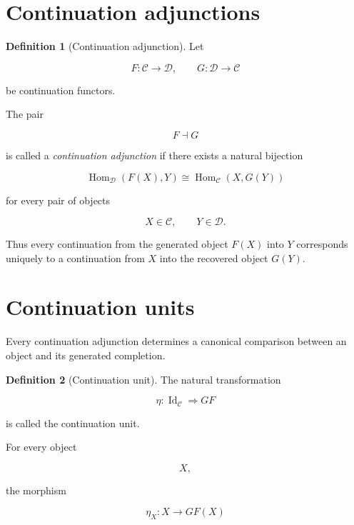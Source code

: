 \documentclass[13pt,openany]{book}
\theoremstyle{plain}
\theoremstyle{definition}
\newtheorem{definition}{Definition}[chapter]
\begin{document}
\section{Continuation adjunctions}

\begin{definition}[Continuation adjunction]
Let

\[
F:\mathcal C\rightarrow\mathcal D,
\qquad
G:\mathcal D\rightarrow\mathcal C
\]

be continuation functors.

The pair

\[
F\dashv G
\]

is called a \emph{continuation adjunction} if there exists a natural bijection

\[
\operatorname{Hom}_{\mathcal D}(F(X),Y)
\cong
\operatorname{Hom}_{\mathcal C}(X,G(Y))
\]

for every pair of objects

\[
X\in\mathcal C,
\qquad
Y\in\mathcal D.
\]

\end{definition}

Thus every continuation from the generated object \(F(X)\) into \(Y\)
corresponds uniquely to a continuation from \(X\) into the recovered object
\(G(Y)\).

\section{Continuation units}

Every continuation adjunction determines a canonical comparison between an
object and its generated completion.

\begin{definition}[Continuation unit]
The natural transformation

\[
\eta:
\operatorname{Id}_{\mathcal C}
\Longrightarrow
GF
\]

is called the continuation unit.
\end{definition}

For every object

\[
X,
\]

the morphism

\[
\eta_X:
X\rightarrow GF(X)
\]
\end{document}
